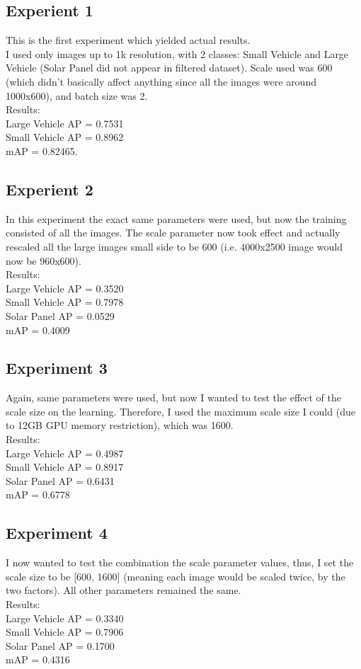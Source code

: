 \documentclass[]{article}
\begin{document}
\subsection{Experient 1}
This is the first experiment which yielded actual results.\\
I used only images up to 1k resolution, with 2 classes: Small Vehicle and Large Vehicle (Solar Panel did not appear in filtered dataset).
Scale used was 600 (which didn't basically affect anything since all the images were around 1000x600), and batch size was 2.\\
Results:\\
Large Vehicle AP = 0.7531\\
Small Vehicle AP = 0.8962\\
mAP = 0.82465.\\

\subsection{Experient 2}
In this experiment the exact same parameters were used, but now the training consisted of all the images. The scale parameter now took effect and actually rescaled all the large images small side to be 600 (i.e. 4000x2500 image would now be 960x600).\\
Results:\\
Large Vehicle AP = 0.3520\\
Small Vehicle AP = 0.7978\\
Solar Panel AP = 0.0529\\
mAP = 0.4009

\subsection{Experiment 3}
Again, same parameters were used, but now I wanted to test the effect of the scale size on the learning. Therefore, I used the maximum scale size I could (due to 12GB GPU memory restriction), which was 1600.\\
Results:\\
Large Vehicle AP = 0.4987\\
Small Vehicle AP = 0.8917\\
Solar Panel AP = 0.6431\\
mAP = 0.6778

\subsection{Experiment 4}
I now wanted to test the combination the scale parameter values, thus, I set the scale size to be [600, 1600] (meaning each image would be scaled twice, by the two factors). All other parameters remained the same.\\
Results:\\
Large Vehicle AP = 0.3340\\
Small Vehicle AP = 0.7906\\
Solar Panel AP = 0.1700\\
mAP = 0.4316
\end{document}
